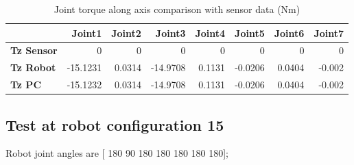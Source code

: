 \begin{table}[h!]
	\centering
	\caption{Joint torque along axis comparison with sensor data (Nm)}
	\label{wrech_Sensor_Pose14}
	\begin{tabular}{|l|r|r|r|r|r|r|r|}
		\hline
		\textbf{} & \textbf{Joint1} & \textbf{Joint2} & \textbf{Joint3} & \textbf{Joint4} & \textbf{Joint5} & \textbf{Joint6} & \textbf{Joint7} \\ \hline
		\textbf{Tz Sensor}  & 0           & 0           & 0            & 0           & 0           & 0           & 0           \\ \hline
		\textbf{Tz Robot}  	& -15.1231           & 0.0314           & -14.9708            & 0.1131           & -0.0206           & 0.0404           & -0.002           \\ \hline
		\textbf{Tz PC}  	& -15.1232           & 0.0314           & -14.9708            & 0.1131           & -0.0206           & 0.0404           & -0.002           \\ \hline
	\end{tabular}
\end{table}


\subsection{Test at robot configuration 15}
Robot joint angles are  [ 180   90  180  180  180  180  180];

